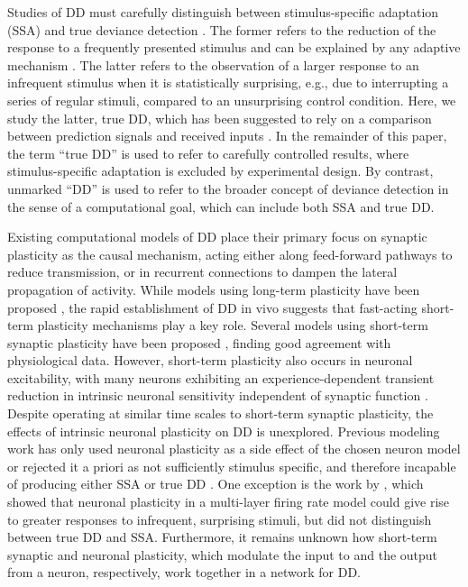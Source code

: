 \documentclass[10pt,letterpaper]{article}
\begin{document}
Studies of DD must carefully distinguish between stimulus-specific adaptation (SSA) and true deviance detection \cite{Ross2020-qf}. The former refers to the reduction of the response to a frequently presented stimulus and can be explained by any adaptive mechanism \cite{May2010-qn, Garagnani2011-eu}. The latter refers to the observation of a larger response to an infrequent stimulus when it is statistically surprising, e.g., due to interrupting a series of regular stimuli, compared to an unsurprising control condition. Here, we study the latter, true DD, which has been suggested to rely on a comparison between prediction signals and received inputs \cite{Parras2017-fp, Carbajal2018-sd, Ross2020-qf}. In the remainder of this paper, the term ``true DD'' \cite{Ross2020-qf, Nelken2014-wr, Fishman2012-et} is used to refer to carefully controlled results, where stimulus-specific adaptation is excluded by experimental design. By contrast, unmarked ``DD'' is used to refer to the broader concept of deviance detection in the sense of a computational goal, which can include both SSA and true DD.

Existing computational models of DD place their primary focus on synaptic plasticity as the causal mechanism, acting either along feed-forward pathways to reduce transmission, or in recurrent connections to dampen the lateral propagation of activity. While models using long-term plasticity have been proposed \cite{Wacongne2012-ah, Hertag2020-kc}, the rapid establishment of DD in vivo \cite{Taaseh2011-gg} suggests that fast-acting short-term plasticity mechanisms play a key role. Several models using short-term synaptic plasticity have been proposed \cite{Mill2011-ah, May2015-lt, Yarden2017-eh}, finding good agreement with physiological data. However, short-term plasticity also occurs in neuronal excitability, with many neurons exhibiting an experience-dependent transient reduction in intrinsic neuronal sensitivity independent of synaptic function \cite{Sanchez-Vives2000-df, Henze2001-xd, Sanchez-Aguilera2014-fd}. Despite operating at similar time scales to short-term synaptic plasticity, the effects of intrinsic neuronal plasticity on DD is unexplored.  Previous modeling work has only used neuronal plasticity as a side effect of the chosen neuron model \cite{Mill2011-ah} or rejected it a priori as not sufficiently stimulus specific, and therefore incapable of producing either SSA or true DD \cite{Yarden2017-eh}. One exception is the work by \cite{Garagnani2011-eu}, which showed that neuronal plasticity in a multi-layer firing rate model could give rise to greater responses to infrequent, surprising stimuli, but did not distinguish between true DD and SSA. Furthermore, it remains unknown how short-term synaptic and neuronal plasticity, which modulate the input to and the output from a neuron, respectively, work together in a network for DD.
\end{document}
